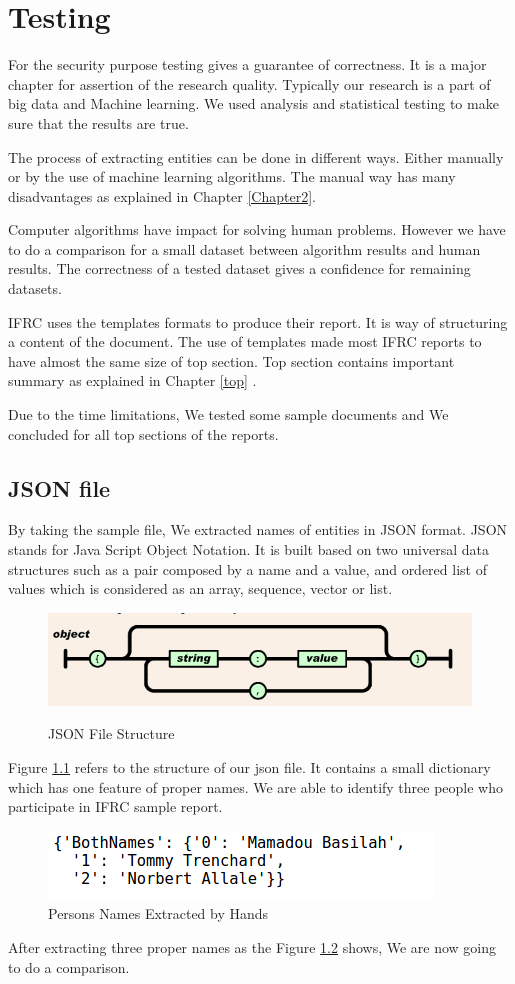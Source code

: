 \chapter{Testing }\label{chp4}
For the security purpose testing gives a guarantee of correctness.  It is a major chapter for assertion of the research quality. Typically our research is a part of big data and Machine learning. We used analysis and statistical testing to make sure that the results are true.

The process of extracting entities can be done in different ways. Either manually or by the use of machine learning algorithms. The manual way has many disadvantages as explained in Chapter \ref{Chapter2}.

Computer algorithms have impact for solving human problems. However we have to do a comparison for a small dataset between algorithm results and human results. The correctness of a tested dataset gives a confidence for remaining datasets.

IFRC uses the templates formats to produce their report. It is way of structuring a content of the document. The use of templates made most IFRC reports to have almost  the same size of top section. Top section contains important summary  as explained in Chapter \ref{top} .

Due to the time limitations, We tested  some  sample documents and We concluded for all top sections of the reports.
\section*{JSON file }
By taking the sample file, We extracted names of entities in JSON format. JSON stands for Java Script Object Notation. It is built based on two universal data structures such as a pair composed by a name and a value, and ordered list of values which is considered as an array, sequence, vector or list.
\begin{figure}[hbtp]
\caption{JSON File Structure}
\centering
\includegraphics[scale=.7]{images/json.png}\label{json}
\end{figure}


Figure \ref{json} refers to the structure of our json file. It contains a small dictionary which has one feature of proper names. We are able to identify three people who participate in IFRC sample report.
\newpage 
\begin{figure}[hbtp]
\centering
\includegraphics[scale=.7]{images/BothNames.png}
\caption{Persons Names Extracted by Hands}\label{Hand}
\end{figure}

After extracting three proper names as the Figure \ref{Hand} shows,  We are now going to do a comparison. 